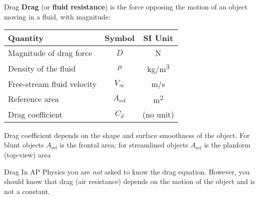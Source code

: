 \documentclass[12pt,compress,aspectratio=169]{beamer}
\newcommand{\eq}[2]{\vspace{#1}{\Large\begin{displaymath}#2\end{displaymath}}}
\begin{document}
\begin{frame}{Drag}
  \textbf{Drag} (or \textbf{fluid resistance}) is the force opposing the
  motion of an object moving in a fluid, with magnitude:

  \eq{-.2in}{
    D=\frac{1}{2}\rho V_\infty^2A_\mathrm{ref}C_d
  }  
  \begin{center}
    \begin{tabular}{l|c|c}
      \rowcolor{pink}
      \textbf{Quantity} & \textbf{Symbol} & \textbf{SI Unit} \\ \hline
      Magnitude of drag force & $D$  & \si{\newton}\\
      Density of the fluid & $\rho$ & \si{\kg/\m^3}\\
      Free-stream fluid velocity & $V_\infty$ & \si{\m/\s}\\
      Reference area   & $A_\mathrm{ref}$ & \si{m^2}\\
      Drag coefficient & $C_d$ & (no unit)
    \end{tabular}
  \end{center}
  {\footnotesize Drag coefficient depends on the shape and surface smoothness
    of the object. For blunt objects $A_\mathrm{ref}$ is the frontal area; for
    streamlined objects $A_\mathrm{ref}$ is the planform (top-view) area\par}
\end{frame}



\begin{frame}{Drag}
  In AP Physics you are \emph{not} asked to know the drag equation. However,
  you should know that drag (air resistance) depends on the motion of the
  object and is not a constant.
\end{frame}
\end{document}
